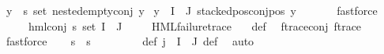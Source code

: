 \begin{isabellebody}
\ {\isacharparenleft}{\kern0pt}{\isasymforall}y{\isasymin}{\isacharparenleft}{\kern0pt}{\isasymPsi}\ {\isacharbackquote}{\kern0pt}\ {\isacharparenleft}{\kern0pt}{\isacharbraceleft}{\kern0pt}{\isacharbraceright}{\kern0pt}{\isacharcolon}{\kern0pt}{\isacharcolon}{\kern0pt}{\isacharprime}{\kern0pt}s\ set{\isacharparenright}{\kern0pt}{\isacharparenright}{\kern0pt}{\isachardot}{\kern0pt}\ nested{\isacharunderscore}{\kern0pt}empty{\isacharunderscore}{\kern0pt}conj\ y{\isacharparenright}{\kern0pt}{\isacharparenright}{\kern0pt}\ {\isasymand}\isanewline
{\isacharparenleft}{\kern0pt}{\isasymforall}y{\isasymin}{\isacharparenleft}{\kern0pt}{\isasymPsi}\ {\isacharbackquote}{\kern0pt}\ {\isacharparenleft}{\kern0pt}I\ {\isasyminter}\ J{\isacharparenright}{\kern0pt}{\isacharparenright}{\kern0pt}{\isachardot}{\kern0pt}\ stacked{\isacharunderscore}{\kern0pt}pos{\isacharunderscore}{\kern0pt}conj{\isacharunderscore}{\kern0pt}pos\ y{\isacharparenright}{\kern0pt}{\isachardoublequoteclose}\ \isanewline
\ \ \ \ \isamarkupfalse%
\ fastforce\ \isanewline
\ \ \isamarkupfalse%
\ {\isasympsi}\ \ {\isachardoublequoteopen}{\isasympsi}\ {\isasymequiv}\ {\isacharparenleft}{\kern0pt}hml{\isacharunderscore}{\kern0pt}conj\ {\isacharparenleft}{\kern0pt}{\isacharbraceleft}{\kern0pt}{\isacharbraceright}{\kern0pt}{\isacharcolon}{\kern0pt}{\isacharcolon}{\kern0pt}{\isacharprime}{\kern0pt}s\ set{\isacharparenright}{\kern0pt}\ {\isacharparenleft}{\kern0pt}I\ {\isasyminter}\ J{\isacharparenright}{\kern0pt}\ {\isasymPsi}{\isacharparenright}{\kern0pt}{\isachardoublequoteclose}\isanewline
\ \ \isamarkupfalse%
\ {\isachardoublequoteopen}HML{\isacharunderscore}{\kern0pt}failure{\isacharunderscore}{\kern0pt}trace\ {\isasympsi}{\isachardoublequoteclose}\ \isamarkupfalse%
\ {\isasympsi}{\isacharunderscore}{\kern0pt}def\ \isamarkupfalse%
\ f{\isacharunderscore}{\kern0pt}trace{\isacharunderscore}{\kern0pt}conj\ f{\isacharunderscore}{\kern0pt}trace\ \isanewline
\ \ \ \ \isamarkupfalse%
\ fastforce\isanewline
\ \ \isamarkupfalse%
\ {\isachardoublequoteopen}{\isasymforall}s{\isachardot}{\kern0pt}\ {\isasymnot}\ s\ {\isasymTurnstile}\ {\isasympsi}{\isachardoublequoteclose}\ \isanewline
\ \ \ \ \isamarkupfalse%
\ {\isasymPsi}{\isacharunderscore}{\kern0pt}def\ {\isacartoucheopen}j\ {\isasymin}\ I\ {\isasyminter}\ J{\isacartoucheclose}\ {\isasympsi}{\isacharunderscore}{\kern0pt}def\ \isamarkupfalse%
\ auto\isanewline
\ \ \isamarkupfalse%

\end{isabellebody}
